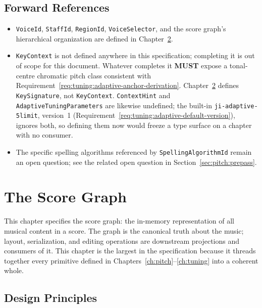 \documentclass[11pt,letterpaper]{report}
\newcommand{\MUST}{\textbf{MUST}}
\begin{document}
\section{Forward References}

\begin{itemize}
  \item \texttt{VoiceId}, \texttt{StaffId}, \texttt{RegionId},
    \texttt{VoiceSelector}, and the score graph's hierarchical
    organization are defined in Chapter~\ref{ch:graph}.
  \item \texttt{KeyContext} is not defined anywhere in this
    specification; completing it is out of scope for this document.
    Whatever completes it \MUST{} expose a tonal-centre chromatic
    pitch class consistent with
    Requirement~\ref{req:tuning:adaptive-anchor-derivation}.
    Chapter~\ref{ch:graph} defines \texttt{KeySignature}, not
    \texttt{KeyContext}. \texttt{ContextHint} and
    \texttt{AdaptiveTuningParameters} are likewise undefined; the
    built-in \texttt{ji-adaptive-5limit}, version~1
    (Requirement~\ref{req:tuning:adaptive-default-version}), ignores
    both, so defining them now would freeze a type surface on a
    chapter with no consumer.
  \item The specific spelling algorithms referenced by
    \texttt{SpellingAlgorithmId} remain an open question; see the
    related open question in Section~\ref{sec:pitch:prepass}.
\end{itemize}

\chapter{The Score Graph}
\label{ch:graph}

This chapter specifies the score graph: the in-memory representation of
all musical content in a score. The graph is the canonical truth about
the music; layout, serialization, and editing operations are downstream
projections and consumers of it. This chapter is the largest in the
specification because it threads together every primitive defined in
Chapters~\ref{ch:pitch}--\ref{ch:tuning} into a coherent whole.

\section{Design Principles}
\label{sec:graph:principles}
\end{document}
